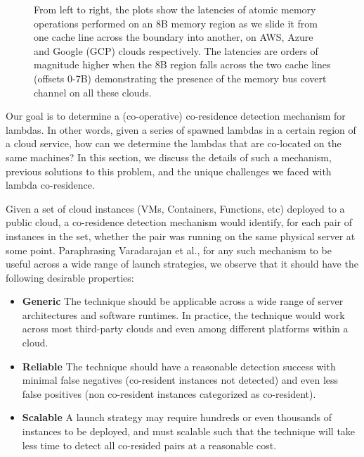 \begin{figure}[h!]
\begin{subfigure}{.33\textwidth}
\end{subfigure}
\caption{From left to right, the plots show the latencies of atomic 
      memory operations performed on an 8B memory region as we slide it 
      from one cache line across the boundary into another, on AWS, Azure and 
      Google (GCP) clouds respectively. The latencies 
      are orders of magnitude higher when the 8B region falls across the 
      two cache lines (offsets 0-7B) demonstrating the presence of 
      the memory bus covert channel on all these clouds. \label{fig:membus_clouds}}
\label{fig:fig}
\end{figure}


Our goal is to determine a (co-operative) co-residence detection mechanism for
lambdas. In other words, given a series of spawned lambdas in a
certain region of a cloud service, how can we determine the lambdas that are
co-located on the same machines?  In this section, we discuss the details of
such a mechanism, previous solutions to this problem, and the unique challenges
we faced with lambda co-residence.

Given a set of cloud instances (VMs, Containers, Functions, etc) deployed
to a public cloud, a co-residence detection mechanism would identify, for each 
pair of instances in the set, whether the pair was running on the same physical 
server at some point. Paraphrasing Varadarajan et al.\cite{varadarajan2015}, for 
any such mechanism to be useful across a wide range of 
launch strategies, we observe that it should have the following desirable 
properties:

\begin{itemize}
    \item \textbf{Generic} The technique should be applicable across a wide
    range of server architectures and software runtimes. In practice, the
    technique would work across most third-party clouds and even among different
    platforms within a cloud.
    \item \textbf{Reliable} The technique should have a reasonable detection success
    with minimal false negatives (co-resident instances not detected) and even 
    less false positives (non co-resident instances categorized as co-resident).
    \item \textbf{Scalable} A launch strategy may require hundreds or even thousands 
    of instances to be deployed, and must scalable such that the 
    technique will take less time to detect all co-resided pairs at a reasonable cost.
\end{itemize}

